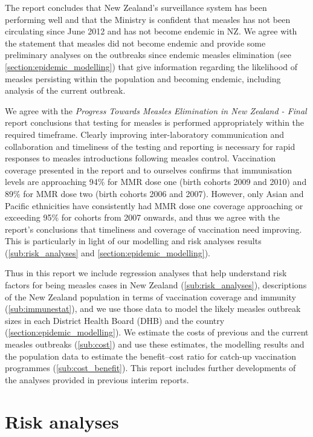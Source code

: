 \documentclass{article}
\begin{document}
The report concludes that New Zealand's surveillance system has been performing well and that the Ministry is confident that measles has not been circulating since June 2012 and has not become endemic in NZ. We agree with the statement that measles did not become endemic and provide some preliminary analyses on the outbreaks since endemic measles elimination (see \autoref{section:epidemic_modelling}) that give information regarding the likelihood of measles persisting within the population and becoming endemic, including analysis of the current outbreak.

We agree with the \emph {Progress Towards Measles Elimination in New Zealand - Final} report conclusions that testing for measles is performed appropriately within the required timeframe. Clearly improving inter-laboratory communication and collaboration and timeliness of the testing and reporting is necessary for rapid responses to measles introductions following measles control. Vaccination coverage presented in the report and to ourselves confirms that immunisation levels are approaching 94\% for MMR dose one (birth cohorts 2009 and 2010) and 89\% for MMR dose two (birth cohorts 2006 and 2007). However, only Asian and Pacific ethnicities have consistently had MMR dose one coverage approaching or exceeding 95\% for cohorts from 2007 onwards, and thus we agree with the report's conclusions that timeliness and coverage of vaccination need improving. This is particularly in light of our modelling and risk analyses results (\autoref{sub:risk_analyses} and \autoref{section:epidemic_modelling}).

Thus in this report we include regression analyses that help understand risk factors for being measles cases in New Zealand (\autoref{sub:risk_analyses}), descriptions of the New Zealand population in terms of vaccination coverage and immunity (\autoref{sub:immunestat}), and we use those data to model the likely measles outbreak sizes in each District Health Board (DHB) and the country (\autoref{section:epidemic_modelling}). We estimate the costs of previous and the current measles outbreaks (\autoref{sub:cost}) and use these estimates, the modelling results and the population data to estimate the benefit--cost ratio for catch-up vaccination programmes (\autoref{sub:cost_benefit}). This report includes further developments of the analyses provided in previous interim reports.

\section{Risk analyses}
\label{sub:risk_analyses}
\end{document}
